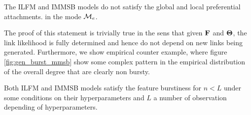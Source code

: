 \begin{proposition}
	The ILFM and IMMSB models do not satisfy the global and local preferential attachments. in the mode $\mathcal{M}_e$.
\end{proposition}

The proof of this statement is trivially true in the sens that given $\mathbf{F}$ and $\mathbf{\Theta}$, the link likelihood is fully determined and hence do not depend on new links being generated. Furthermore, we show empirical counter example, where figure \ref{fig:gen_burst_mmsb} show some complex pattern in the empirical distribution of the overall degree that are clearly non bursty.

\begin{proposition} \label{prop:diaconis}
	Both ILFM and IMMSB models satisfy the feature burstiness for $n < L$ under some conditions on their hyperparameters  and $L$ a number of observation depending of hyperparameters.
\end{proposition}

